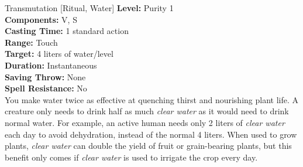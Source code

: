 {Transmutation [Ritual, Water]}
{
	\textbf{Level:}
	Purity 1\\
	\textbf{Components:}
	V, S\\
	\textbf{Casting Time:}
	1 standard action\\
	\textbf{Range:}
	Touch\\
	\textbf{Target:}
	4 liters of water/level\\
	\textbf{Duration:}
	Instantaneous\\
	\textbf{Saving Throw:}
	None\\
	\textbf{Spell Resistance:}
	No\\
}
{
	You make water twice as effective at quenching thirst and nourishing plant life. A creature only needs to drink half as much \emph{clear water} as it would need to drink normal water. For example, an active human needs only 2 liters of \emph{clear water} each day to avoid dehydration, instead of the normal 4 liters. When used to grow plants, \emph{clear water} can double the yield of fruit or grain-bearing plants, but this benefit only comes if \emph{clear water} is used to irrigate the crop every day.
}
